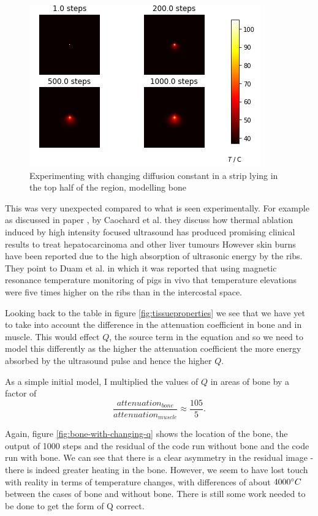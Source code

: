 \documentclass[11pt]{article} %
\begin{document}
\begin{figure}
	\centering
	\includegraphics[width=0.8\linewidth]{"Report_images/change diffusion constant"}
	\caption{Experimenting with changing diffusion constant in a strip lying in the top half of the region, modelling bone}
	\label{fig:change-diffusion-constant}
\end{figure}

This was very unexpected compared to what is seen  experimentally. For example as discussed in paper \cite{Cochard2009}, by Caochard et al. they discuss how thermal ablation induced by high intensity focused ultrasound has produced promising clinical results to treat hepatocarcinoma and other liver tumours However skin burns have been reported due to the high absorption of ultrasonic energy by the ribs. They point to Duam et al. \cite{Daum1999}  in which it was reported that using magnetic resonance temperature monitoring of pigs in vivo that  temperature elevations were five times higher on the ribs than in the intercostal space. 

Looking back to the table in figure \ref{fig:tissueproperties} we see that we have yet to take into account the difference in the  attenuation coefficient in bone and in muscle. This would effect $ Q $, the source term in the equation and so we need to model this differently as the higher the attenuation coefficient the more energy absorbed by the ultrasound pulse and hence the higher $ Q $. 

  
 As a simple initial model, I multiplied the values of $ Q $ in areas of bone by a factor of $$ \frac{attenuation_{bone}}{attenuation_{muscle}} \approx \frac{105}{5} .$$
 
 Again, figure  \ref{fig:bone-with-changing-q} shows the location of the bone, the output of 1000 steps and  the residual of the code run without bone and the code run with bone. We can see that there is a clear asymmetry in the residual image - there is indeed greater heating in the bone.  However, we seem to have lost touch with reality in terms of temperature changes, with differences of about $ 4000 \degree C $ between the cases of bone and without bone. There is still some work needed to be done to get the form of Q correct. 
 
\end{document}
